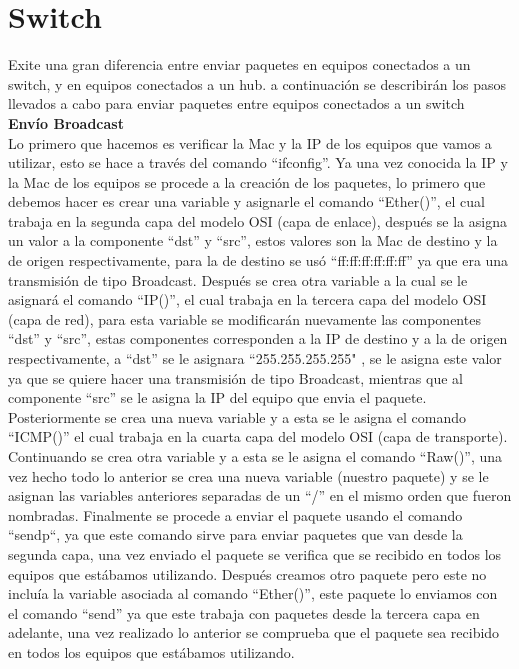 \documentclass{udpreport}
\begin{document}
	\section{Switch}
		Exite una gran diferencia entre enviar paquetes en equipos conectados a un switch, y en equipos conectados a un hub. a
		continuación se describirán los pasos llevados a cabo para enviar paquetes entre equipos conectados a un switch\\
		{\bf \large Envío Broadcast}\\
		Lo primero que hacemos es verificar la Mac y la IP de los equipos que vamos a utilizar, esto se hace a través del
		comando “ifconfig”. Ya una vez conocida la IP y la Mac de los equipos se procede a la creación de los paquetes, lo
		primero que debemos hacer es crear una variable y asignarle el comando “Ether()”, el cual trabaja en la segunda capa
		del modelo OSI (capa de enlace), después se la asigna un valor a la componente “dst” y “src”, estos valores son la Mac
		de destino
		y la de origen respectivamente, para la de destino se usó “ff:ff:ff:ff:ff:ff” ya que era una transmisión de tipo
		Broadcast. Después se crea otra variable a la cual se le asignará el comando “IP()”, el cual trabaja en la tercera
		capa del modelo OSI (capa de red), para esta variable se modificarán nuevamente las componentes “dst” y “src”, estas
		componentes corresponden a la IP de destino y a la de origen respectivamente, a “dst” se le asignara “255.255.255.255"
		, se le asigna este valor ya que se quiere hacer una transmisión de tipo Broadcast, mientras que al componente “src”
		se le asigna la IP del equipo que envia el paquete. Posteriormente se crea una nueva variable y a esta se le asigna el
		comando “ICMP()” el cual trabaja en la cuarta capa del modelo OSI (capa de transporte). Continuando se crea otra
		variable y a esta se le asigna el comando “Raw()”, una vez hecho todo lo anterior se crea una nueva variable (nuestro
		paquete)  y se le asignan las variables anteriores separadas de un “/” en el mismo orden que fueron nombradas.
		Finalmente se procede a enviar el paquete usando el comando “sendp“, ya que este comando sirve para enviar paquetes
		que van desde la segunda capa, una vez enviado el paquete se verifica que se recibido en todos los equipos que
		estábamos utilizando. Después creamos otro paquete pero este no incluía la variable asociada al comando “Ether()”,
		este paquete lo enviamos con el comando “send” ya que este trabaja con paquetes desde la tercera capa en adelante, una
		vez realizado lo anterior se comprueba que el paquete sea recibido en todos los equipos que estábamos utilizando.
\end{document}
